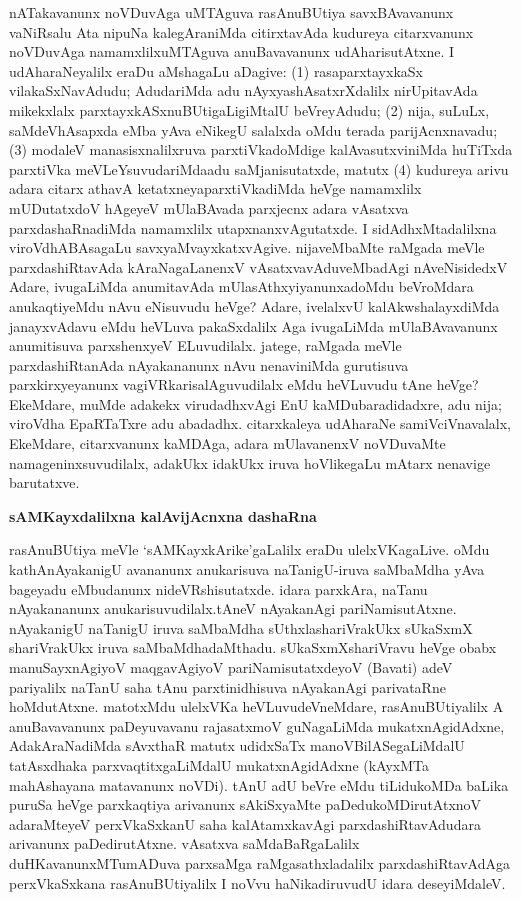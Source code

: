nATakavanunx noVDuvAga uMTAguva rasAnuBUtiya savxBAvavanunx vaNiR\-salu Ata nipuNa kalegAraniMda citirxtavAda kudureya citarxvanunx noVDuvAga namamxlilx\break uMTAguva anuBavavanunx udAharisutAtxne. I udAharaNeyalilx eraDu aMsha\-gaLu aDagive: (1) rasaparxtayxkaSx vilakaSxNavAdudu; AdudariMda adu nAyxyashAsatxrXdalilx nirUpitavAda mikekxlalx parxtayxkASxnuBUtigaLigiMtalU beVreyAdudu; (2) nija, \hbox{suLuLx}, saMdeVhAsapxda eMba yAva eNikegU salalxda oMdu terada parijAcnxnavadu; (3) modaleV manasisxnalilxruva parxtiVkadoMdige kalAvasutxviniMda huTiTxda parxtiVka meVLeYsuvudariMda\break adu saMjanisutatxde, matutx (4) kudureya arivu adara citarx athavA ketatxneya\break parxtiVkadiMda heVge namamxlilx mUDutatxdoV hAgeyeV mUlaBAvada parxjecnx adara vAsatxva parxdashaRnadiMda namamxlilx utapxnanxvAgutatxde. I sidAdhxMtadalilxna viroVdhABAsagaLu savxyaM\break\-vayxkatxvAgive. nijaveMbaMte raMgada meVle parxdashiRtavAda kAraNagaLanenxV vAsatxvavAdu\break\-veMbadAgi nAveNisidedxV Adare, ivugaLiMda anumitavAda mUlasAthxyiyanunx\break adoMdu beVroMdara anukaqtiyeMdu nAvu eNisuvudu heVge? Adare, ive\-lalxvU kalAkwshalayxdiMda janayxvAdavu eMdu heVLuva pakaSxdalilx Aga ivugaLiMda mUla\-BAvavanunx anumitisuva parxshenxyeV ELuvudilalx. jatege, raMgada meVle parxdashiRtanAda nAyakananunx nAvu nenaviniMda gurutisuva parxkirxyeyanunx vagiVRkarisalAguvudilalx eMdu heVLuvudu tAne heVge? EkeMdare, muMde adakekx virudadhxvAgi EnU kaMDu\-baradidadxre, adu nija; viroVdha EpaRTaTxre adu abadadhx. citarxkaleya udAharaNe samiVciVnavalalx, EkeMdare, citarxvanunx kaMDAga, adara mUlavanenxV noVDuvaMte nama\-geninxsuvudilalx, adakUkx idakUkx iruva hoVlikegaLu mAtarx nenavige barutatxve.

\smallskip
\begin{center}
{\Large\bf sAMKayxdalilxna kalAvijAcnxna dashaRna}
\end{center}

rasAnuBUtiya meVle `sAMKayxkArike'gaLalilx eraDu ulelxVKagaLive. oMdu kathA\-nAyakanigU avananunx anukarisuva naTanigU-iruva saMbaMdha yAva bageyadu eMbudanunx nideVRshisutatxde. idara parxkAra, naTanu nAyakananunx anukarisuvu\-dilalx.\break tAneV nAyakanAgi pariNamisutAtxne. nAyakanigU naTanigU iruva saMbaMdha sUthxla\-shariVrakUkx sUkaSxmX shariVrakUkx iruva saMbaMdhadaMthadu. sUkaSxmXshariVravu heVge obabx manuSayxnAgiyoV maqgavAgiyoV pariNamisutatxdeyoV (Bavati) adeV pariyalilx naTanU saha tAnu parxtinidhisuva nAyakanAgi parivataRne hoMdutAtxne. matotxMdu ulelxVKa heVLuvudeVneMdare, rasAnuBUtiyalilx A anuBavavanunx paDeyuvavanu rajasatxmoV guNagaLiMda mukatxnAgidAdxne, AdakAraNadiMda sAvxthaR matutx udidxSaTx manoVBilASegaLiMdalU tatAsxdhaka parxvaqtitxgaLiMdalU mukatxnAgidAdxne (kAyxMTa mahAshayana matavanunx noVDi). tAnU adU beVre eMdu tiLidukoMDa baLika puruSa heVge parxkaqtiya arivanunx sAkiSxyaMte paDedukoMDirutAtxnoV adaraMteyeV perxVkaSxkanU saha kalAtamxkavAgi parxdashiRtavAdudara arivanunx paDedirutAtxne. vAsatxva saMdaBaRgaLalilx duHKavanunxMTumADuva parxsaMga raMgasathxladalilx parxdashiRtavAdAga perxVkaSxkana rasAnuBUtiyalilx I noVvu haNikadiruvudU idara deseyiMdaleV.

